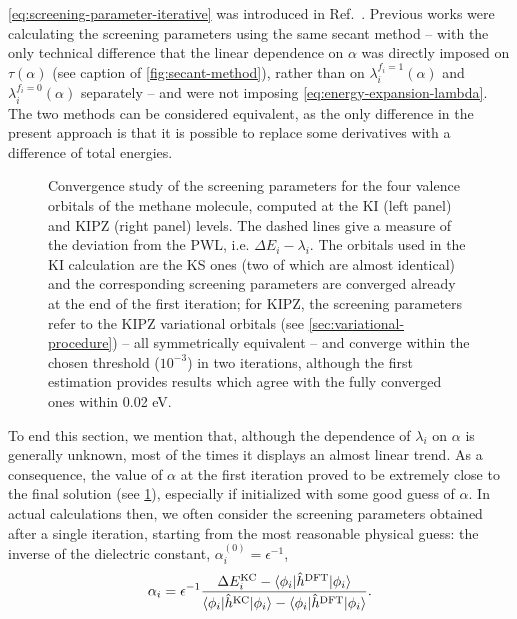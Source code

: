 \cref{eq:screening-parameter-iterative} was introduced in Ref.~\cite{nguyen_koopmans-compliant_2018}. Previous works were calculating the screening parameters using the same secant method -- with the only technical difference that the linear dependence on $\alpha$ was directly imposed on $\tau(\alpha)$ (see caption of \cref{fig:secant-method}), rather than on $\lambda_i^{f_i=1}(\alpha)$ and $\lambda_i^{f_i=0}(\alpha)$ separately -- and were not imposing \cref{eq:energy-expansion-lambda}. The two methods can be considered equivalent, as the only difference in the present approach is that it is possible to replace some derivatives with a difference of total energies.

\begin{figure}
    \centering
     \qquad
    \caption[Convergence of screening parameters]{Convergence study of the screening parameters for the four valence orbitals of the methane molecule, computed at the KI (left panel) and KIPZ (right panel) levels. The dashed lines give a measure of the deviation from the PWL, i.e. $\Delta E_i - \lambda_i$. The orbitals used in the KI calculation are the KS ones (two of which are almost identical) and the corresponding screening parameters are converged already at the end of the first iteration; for KIPZ, the screening parameters refer to the KIPZ variational orbitals (see \cref{sec:variational-procedure}) -- all symmetrically equivalent -- and converge within the chosen threshold ($10^{-3}$) in two iterations, although the first estimation provides results which agree with the fully converged ones within 0.02 eV.}
    \label{fig:alphas-convergence}
\end{figure}

To end this section, we mention that, although the dependence of $\lambda_i$ on $\alpha$ is generally unknown, most of the times it displays an almost linear trend. As a consequence, the value of $\alpha$ at the first iteration proved to be extremely close to the final solution (see \cref{fig:alphas-convergence}), especially if initialized with some good guess of $\alpha$. In actual calculations then, we often consider the screening parameters obtained after a single iteration, starting from the most reasonable physical guess: the inverse of the dielectric constant, $\alpha_i^{(0)} = \epsilon^{-1}$,
%
\begin{equation}
    \alpha_i = \epsilon^{-1} \frac{\Delta E^{\rm KC}_i - \braket{\phi_i|\hat{h}^{\rm DFT}|\phi_i}}{\braket{\phi_i|\hat{h}^{\rm KC}|\phi_i} - \braket{\phi_i|\hat{h}^{\rm DFT}|\phi_i}} .
    \label{eq:screening-parameter-dscf}
\end{equation}

